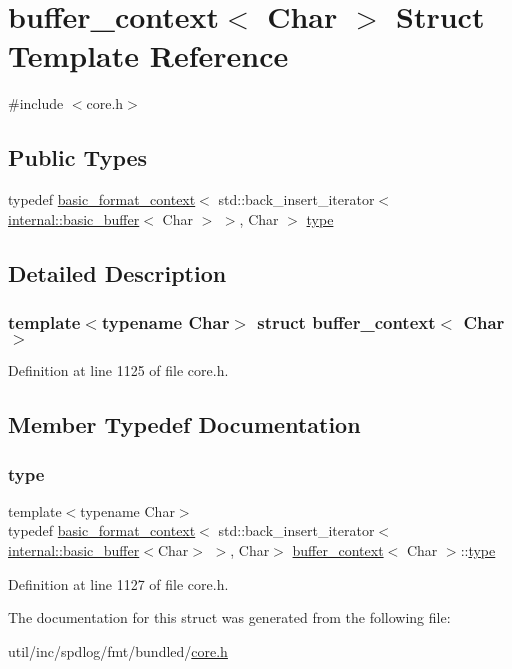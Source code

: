 \hypertarget{structbuffer__context}{}\section{buffer\+\_\+context$<$ Char $>$ Struct Template Reference}
\label{structbuffer__context}


{\ttfamily \#include $<$core.\+h$>$}

\subsection*{Public Types}
\begin{DoxyCompactItemize}
\item 
typedef \hyperlink{classbasic__format__context}{basic\+\_\+format\+\_\+context}$<$ std\+::back\+\_\+insert\+\_\+iterator$<$ \hyperlink{classinternal_1_1basic__buffer}{internal\+::basic\+\_\+buffer}$<$ Char $>$ $>$, Char $>$ \hyperlink{structbuffer__context_a40b7c25f5abe4d5621a585c9ff06a020}{type}
\end{DoxyCompactItemize}


\subsection{Detailed Description}
\subsubsection*{template$<$typename Char$>$\newline
struct buffer\+\_\+context$<$ Char $>$}



Definition at line 1125 of file core.\+h.



\subsection{Member Typedef Documentation}
\mbox{\label{structbuffer__context_a40b7c25f5abe4d5621a585c9ff06a020}} 
\subsubsection{\texorpdfstring{type}{type}}
{\footnotesize\ttfamily template$<$typename Char$>$ \\
typedef \hyperlink{classbasic__format__context}{basic\+\_\+format\+\_\+context}$<$ std\+::back\+\_\+insert\+\_\+iterator$<$\hyperlink{classinternal_1_1basic__buffer}{internal\+::basic\+\_\+buffer}$<$Char$>$ $>$, Char$>$ \hyperlink{structbuffer__context}{buffer\+\_\+context}$<$ Char $>$\+::\hyperlink{structbuffer__context_a40b7c25f5abe4d5621a585c9ff06a020}{type}}



Definition at line 1127 of file core.\+h.



The documentation for this struct was generated from the following file\+:\begin{DoxyCompactItemize}
\item 
util/inc/spdlog/fmt/bundled/\hyperlink{core_8h}{core.\+h}\end{DoxyCompactItemize}
